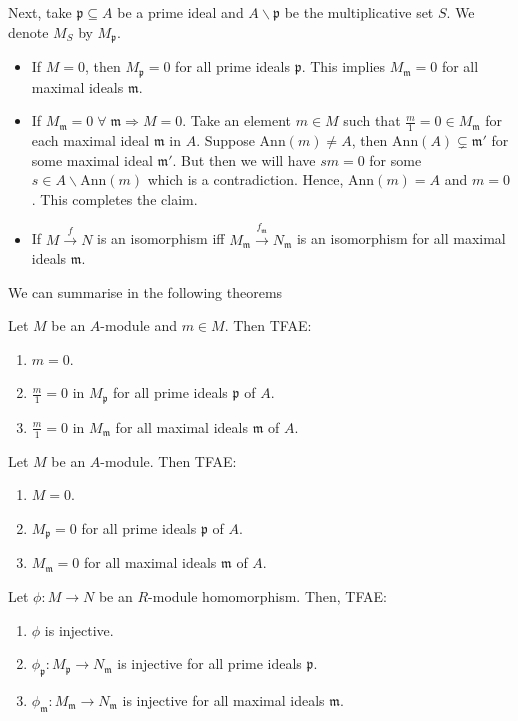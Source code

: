 \documentclass[oneside, 12pt]{scrbook}
\newcommand{\pr}{\mathfrak{p}}
\newcommand{\m}{\mathfrak{m}}
\newcommand{\bs}{\backslash}
\theoremstyle{theorem}
\begin{document}
Next, take $\pr \subseteq A$ be a prime ideal and $A\backslash \pr$ be the multiplicative set $S$. We denote $M_{S}$ by $M_{\pr}$.
\begin{itemize}
\item If $M=0$, then $M_{\pr} =0$ for all prime ideals $\pr$. This implies $M_{\m} =0$ for all maximal ideals $\m$.
\item If $M_{\m} =0 \; \forall \; \m \Rightarrow M=0$. Take an element $m \in M$ such that $\frac{m}{1}=0 \in M_{\m}$ for each maximal ideal $\m $ in $A$. Suppose $\mathrm{Ann}(m) \neq A$, then $\mathrm{Ann}(A) \subsetneq \m'$ for some maximal ideal $\m'$. But then we will have $sm=0$ for some $s\in A \bs \mathrm{Ann}(m)$ which is a contradiction. Hence, $\mathrm{Ann}(m)=A$ and $m=0$. This completes the claim.
\item If $M \xrightarrow{f} N$ is an isomorphism iff $M_{\m} \xrightarrow{f_{\m}} N_{\m}$ is an isomorphism for all maximal ideals $\m$.
\end{itemize}
We can summarise in the following theorems
\begin{theorem}
Let $M$ be an $A$-module and $m \in M$. Then TFAE:
\begin{enumerate}
\item $m=0$.
\item $\frac{m}{1}=0$ in $M_{\pr}$ for all prime ideals $\pr$ of $A$.
\item $\frac{m}{1}=0$ in $M_{\m}$ for all maximal ideals $\m$ of $A$. 
\end{enumerate}
\end{theorem}

\begin{theorem}
Let $M$ be an $A$-module. Then TFAE:
\begin{enumerate}
\item $M=0$.
\item $M_{\pr}=0$ for all prime ideals $\pr$ of $A$.
\item $M_{\m}=0$ for all maximal ideals $\m$ of $A$. 
\end{enumerate}
\end{theorem}

\begin{theorem}
Let $\phi: M \rightarrow N$ be an $R$-module homomorphism. Then, TFAE:
\begin{enumerate}
\item $\phi$ is injective. 
\item $\phi_{\pr}: M_{\pr} \rightarrow N_{\m}$ is injective for all prime ideals $\pr$.
\item $\phi_{\m} : M_{\m} \rightarrow N_{\m}$ is injective for all maximal ideals $\m$.
\end{enumerate} 
\end{theorem}
\end{document}
